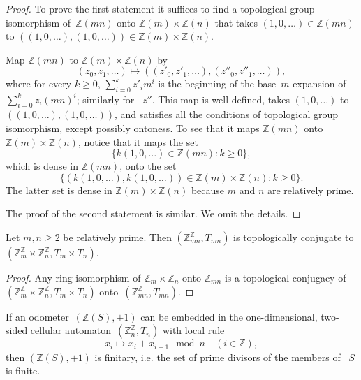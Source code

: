 \documentclass[12pt]{amsart}
\begin{document}
\begin{proof}
To prove the first statement it suffices to find a topological group isomorphism  of~${\mathbb Z}(mn)$ onto
${\mathbb Z}(m) \times{\mathbb Z}(n)$
that takes 
$(1,0,\dots) \in {\mathbb Z}(mn)$ to
$((1,0,\dots),(1,0,\dots)) \in 
{\mathbb Z}(m) \times {\mathbb Z}(n)$.

Map ${\mathbb Z}(mn)$ to
${\mathbb Z}(m) \times {\mathbb Z}(n)$ by
$$(z_0,z_1,\dots) \mapsto
  ((z'_0,z'_1,\dots),(z''_0,z''_1,\dots)),$$
where for every $k \ge 0$,
$\sum_{i=0}^k z'_i m^i$ is the beginning of the base~$m$ expansion of $\sum_{i=0}^k z_i (mn)^i$;
similarly for ~$z''$.
This map is well-defined, takes
$(1,0,\dots)$ to
\linebreak
$((1,0,\dots),(1,0,\dots))$,
 and satisfies all the conditions of topological group isomorphism, except possibly ontoness.  To see that it maps ${\mathbb Z}(mn)$ onto
${\mathbb Z}(m) \times {\mathbb Z}(n)$, notice that it maps the set
$$\{k(1,0,\dots) \in {\mathbb Z}(mn): k \ge 0\},$$
which is dense in ${\mathbb Z}(mn)$, onto the set
$$\{(k(1,0,\dots),k(1,0,\dots)) \in {\mathbb Z}(m) \times {\mathbb Z}(n): k \ge 0\}.$$
The latter set is dense in
${\mathbb Z}(m) \times {\mathbb Z}(n)$
because $m$ and $n$ are relatively prime.

The proof of the second statement is similar.  We omit the details.
\end{proof}

\begin{lemma}
Let $m,n \ge 2$ be relatively prime.
Then $({\mathbb Z}_{mn}^{\mathbb Z},T_{mn})$ is topologically conjugate to
$({\mathbb Z}_m^{\mathbb Z} \times {\mathbb Z}_n^{\mathbb Z},T_m \times T_n)$.
\end{lemma}

\begin{proof}
Any ring isomorphism of 
${\mathbb Z}_m \times {\mathbb Z}_n$ onto
${\mathbb Z}_{mn}$ 
is a topological conjugacy of
$({\mathbb Z}_{m}^{\mathbb Z} \times {\mathbb Z}_{n}^{\mathbb Z},T_m \times T_n)$ 
onto~$({\mathbb Z}_{mn}^{\mathbb Z},T_{mn})$.
\end{proof}

\begin{Th2B}
If an {odometer}\ $({\mathbb Z}(S),+1)$   can be embedded in the one-dimensional, two-sided {cellular automaton}\  
$({\mathbb Z}_n^{\mathbb Z},T_n)$  with local rule
$$
x_i \mapsto  x_i + x_{i+1} \mod n  \quad (i \in {\mathbb Z}),
$$
then $({\mathbb Z}(S),+1)$ is finitary,
i.e. the set of prime divisors of the members of ~$S$ is finite.
\end{Th2B}
\end{document}
